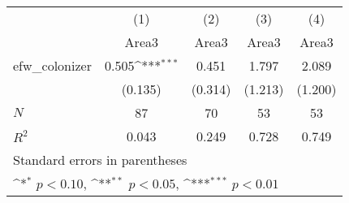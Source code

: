 {
\def\sym#1{\ifmmode^{#1}\else\(^{#1}\)\fi}
\begin{tabular}{l*{4}{c}}
\hline\hline
            &\multicolumn{1}{c}{(1)}&\multicolumn{1}{c}{(2)}&\multicolumn{1}{c}{(3)}&\multicolumn{1}{c}{(4)}\\
            &\multicolumn{1}{c}{Area3}&\multicolumn{1}{c}{Area3}&\multicolumn{1}{c}{Area3}&\multicolumn{1}{c}{Area3}\\
\hline
efw\_colonizer&       0.505\sym{***}&       0.451         &       1.797         &       2.089         \\
            &     (0.135)         &     (0.314)         &     (1.213)         &     (1.200)         \\
\hline
\(N\)       &          87         &          70         &          53         &          53         \\
\(R^{2}\)   &       0.043         &       0.249         &       0.728         &       0.749         \\
\hline\hline
\multicolumn{5}{l}{\footnotesize Standard errors in parentheses}\\
\multicolumn{5}{l}{\footnotesize \sym{*} \(p<0.10\), \sym{**} \(p<0.05\), \sym{***} \(p<0.01\)}\\
\end{tabular}
}
